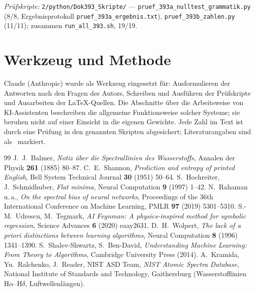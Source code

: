 \vspace{1em}
\noindent\textit{Prüfskripte:} \texttt{2/python/Dok393\_Skripte/} ---
\texttt{pruef\_393a\_nulltest\_grammatik.py} (8/8, Ergebnisprotokoll
\texttt{pruef\_393a\_ergebnis.txt}), \texttt{pruef\_393b\_zahlen.py} (11/11); zusammen
\texttt{run\_all\_393.sh}, 19/19.

\section*{Werkzeug und Methode}

Claude (Anthropic) wurde als Werkzeug eingesetzt für: Ausformulieren der Antworten nach den Fragen des
Autors, Schreiben und Ausführen der Prüfskripte und Ausarbeiten der \LaTeX-Quellen. Die Abschnitte
über die Arbeitsweise von KI-Assistenten beschreiben die allgemeine Funktionsweise solcher Systeme; sie
beruhen nicht auf einer Einsicht in die eigenen Gewichte. Jede Zahl im Text ist durch eine Prüfung in
den genannten Skripten abgesichert; Literaturangaben sind als \QM\ markiert.

\begin{thebibliography}{99}
 J.~J.~Balmer, \textit{Notiz über die Spectrallinien des Wasserstoffs}, Annalen der Physik \textbf{261} (1885) 80--87.
 C.~E.~Shannon, \textit{Prediction and entropy of printed English}, Bell System Technical Journal \textbf{30} (1951) 50--64.
 S.~Hochreiter, J.~Schmidhuber, \textit{Flat minima}, Neural Computation \textbf{9} (1997) 1--42.
 N.~Rahaman u.\,a., \textit{On the spectral bias of neural networks}, Proceedings of the 36th International Conference on Machine Learning, PMLR \textbf{97} (2019) 5301--5310.
 S.-M.~Udrescu, M.~Tegmark, \textit{AI Feynman: A physics-inspired method for symbolic regression}, Science Advances \textbf{6} (2020) eaay2631.
 D.~H.~Wolpert, \textit{The lack of a priori distinctions between learning algorithms}, Neural Computation \textbf{8} (1996) 1341--1390.
 S.~Shalev-Shwartz, S.~Ben-David, \textit{Understanding Machine Learning: From Theory to Algorithms}, Cambridge University Press (2014).
 A.~Kramida, Yu.~Ralchenko, J.~Reader, NIST ASD Team, \textit{NIST Atomic Spectra Database}, National Institute of Standards and Technology, Gaithersburg (Wasserstofflinien H$\alpha$--H$\delta$, Luftwellenlängen).
\end{thebibliography}
